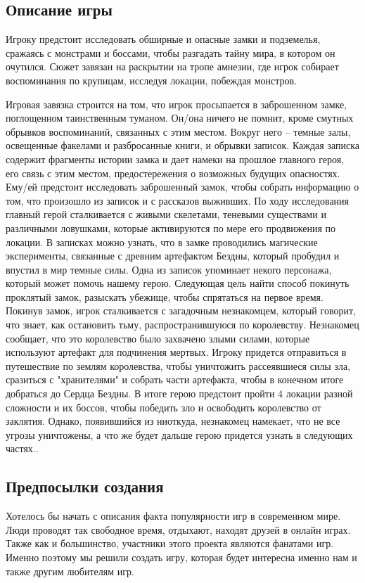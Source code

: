 \documentclass{article}
\begin{document}
\subsection{Описание игры}
Игроку предстоит исследовать обширные и опасные замки и подземелья, сражаясь с монстрами и боссами, чтобы разгадать тайну мира, в котором он очутился. Сюжет завязан на раскрытии на тропе амнезии, где игрок собирает воспоминания по крупицам, исследуя локации, побеждая монстров.\\[2mm]\par
Игровая завязка строится на том, что игрок просыпается в заброшенном замке, поглощенном таинственным туманом. Он/она ничего не помнит, кроме смутных обрывков воспоминаний, связанных с этим местом. Вокруг него – темные залы, освещенные факелами и разбросанные книги, и обрывки записок. Каждая записка содержит фрагменты истории замка и дает намеки на прошлое главного героя, его связь с этим местом, предостережения о возможных будущих опасностях. Ему/ей предстоит исследовать заброшенный замок, чтобы собрать информацию о том, что произошло из записок и с рассказов выживших. По ходу исследования главный герой сталкивается с живыми скелетами, теневыми существами и различными ловушками, которые активируются по мере его продвижения по локации. В записках можно узнать, что в замке проводились магические эксперименты, связанные с древним артефактом Бездны, который пробудил и впустил в мир темные силы. Одна из записок упоминает некого персонажа, который может помочь нашему герою. Следующая цель найти способ покинуть проклятый замок,  разыскать убежище, чтобы спрятаться на первое время. Покинув замок, игрок сталкивается с загадочным незнакомцем, который говорит, что знает, как остановить тьму, распространившуюся по королевству. Незнакомец сообщает, что это королевство было захвачено злыми силами, которые используют артефакт для подчинения мертвых. Игроку придется отправиться в путешествие по землям королевства, чтобы уничтожить рассеявшиеся силы зла, сразиться с "хранителями" и собрать части артефакта, чтобы в конечном итоге добраться до Сердца Бездны. В итоге герою предстоит пройти 4 локации разной сложности и их боссов, чтобы победить зло и освободить королевство от заклятия. Однако, появившийся из ниоткуда, незнакомец намекает, что не все угрозы уничтожены, а что же будет дальше герою придется узнать в следующих частях..


\subsection{Предпосылки создания}
Хотелось бы начать с описания факта популярности игр в современном мире. Люди проводят так свободное время, отдыхают, находят друзей в онлайн играх. Также как и большинство, участники этого проекта являются фанатами игр. Именно поэтому мы решили создать игру, которая будет интересна именно нам и также другим любителям игр. 
\end{document}
